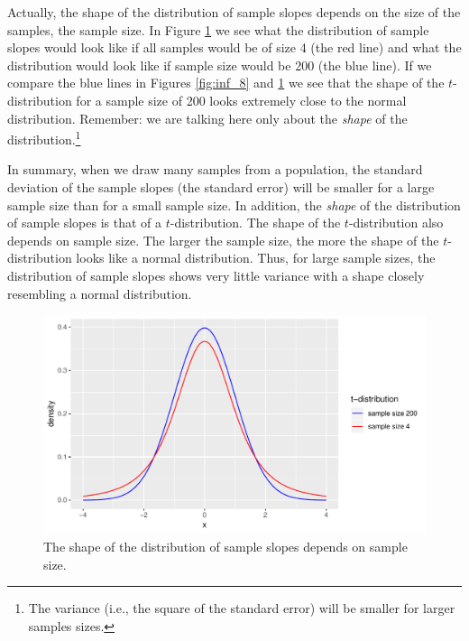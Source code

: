 \documentclass[]{book}\usepackage[]{graphicx}\usepackage[]{color}
\makeatletter
\def\maxwidth{ %
  \ifdim\Gin@nat@width>\linewidth
    \linewidth
  \else
    \Gin@nat@width
  \fi
}
\newenvironment{knitrout}{}{} %
\makeatother
\begin{document}
Actually, the shape of the distribution of sample slopes depends on the size of the samples, the sample size. In Figure \ref{fig:inf_9} we see what the distribution of sample slopes would look like if all samples would be of size 4 (the red line) and what the distribution would look like if sample size would be 200 (the blue line). If we compare the blue lines in Figures \ref{fig:inf_8} and \ref{fig:inf_9} we see that the shape of the $t$-distribution for a sample size of 200 looks extremely close to the normal distribution. Remember: we are talking here only about the \textit{shape} of the distribution.\footnote{The variance (i.e., the square of the standard error) will be smaller for larger samples sizes.} 


In summary, when we draw many samples from a population, the standard deviation of the sample slopes (the standard error) will be smaller for a large sample size than for a small sample size. In addition, the \textit{shape} of the distribution of sample slopes is that of a $t$-distribution. The shape of the $t$-distribution also depends on sample size. The larger the sample size, the more the shape of the $t$-distribution looks like a normal distribution. Thus, for large sample sizes, the distribution of sample slopes shows very little variance with a shape closely resembling a normal distribution.


\begin{knitrout}
\color{fgcolor}\begin{figure}

{\centering \includegraphics[width=\maxwidth]{figure/inf_9-1} 

}

\caption[The shape of the distribution of sample slopes depends on sample size]{The shape of the distribution of sample slopes depends on sample size.}\label{fig:inf_9}
\end{figure}


\end{knitrout}
\end{document}
